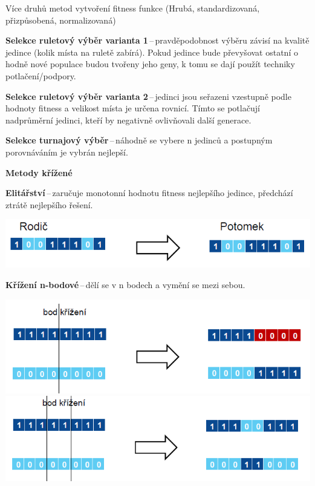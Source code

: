 Více druhů metod vytvoření fitness funkce (Hrubá, standardizovaná, přizpůsobená, normalizovaná)

\textbf{Selekce ruletový výběr varianta 1}\,--\,pravděpodobnost výběru závisí na kvalitě jedince (kolik místa na ruletě zabírá). Pokud jedince bude převyšovat ostatní o hodně nové populace budou tvořeny jeho geny, k tomu se dají použít techniky potlačení/podpory.

\textbf{Selekce ruletový výběr varianta 2}\,--\,jedinci jsou seřazeni vzestupně podle hodnoty fitness a velikost místa je určena rovnicí. Tímto se potlačují nadprůměrní jedinci, kteří by negativně ovlivňovali další generace.

\textbf{Selekce turnajový výběr}\,--\,náhodně se vybere n jedinců a postupným porovnáváním je vybrán nejlepší.

\begin{Large}\vspace{0,5cm} \textbf{Metody křížené}
\end{Large}

\textbf{Elitářství}\,--\,zaručuje monotonní hodnotu fitness nejlepšího jedince, předchází ztrátě nejlepšího řešení.

\begin{center}
\includegraphics[scale=0.7]{BPC-TIN/images/elita.PNG}
\end{center}

\textbf{Křížení n-bodové}\,--\,dělí se v n bodech a vymění se mezi sebou.

\begin{center}
\includegraphics[scale=0.55]{BPC-TIN/images/1bod.PNG}
\includegraphics[scale=0.55]{BPC-TIN/images/2bod.PNG}

\end{center}

